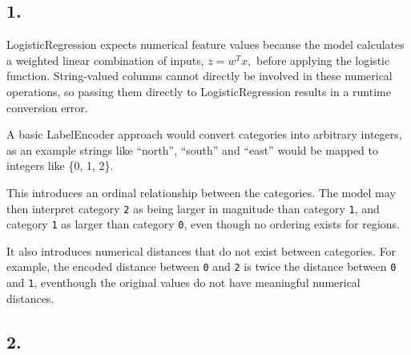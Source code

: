 \documentclass[11pt]{article}
\begin{document}
    \subsection{1.}

LogisticRegression expects numerical feature values because the model
calculates a weighted linear combination of inputs, \(z=w^Tx,\) before
applying the logistic function. String-valued columns cannot directly be
involved in these numerical operations, so passing them directly to
LogisticRegression results in a runtime conversion error.

A basic LabelEncoder approach would convert categories into arbitrary
integers, as an example strings like ``north'', ``south'' and ``east''
would be mapped to integers like \{0, 1, 2\}.

This introduces an ordinal relationship between the categories. The
model may then interpret category \texttt{2} as being larger in
magnitude than category \texttt{1}, and category \texttt{1} as larger
than category \texttt{0}, even though no ordering exists for regions.

It also introduces numerical distances that do not exist between
categories. For example, the encoded distance between \texttt{0} and
\texttt{2} is twice the distance between \texttt{0} and \texttt{1},
eventhough the original values do not have meaningful numerical
distances.

    \subsection{2.}
\end{document}
